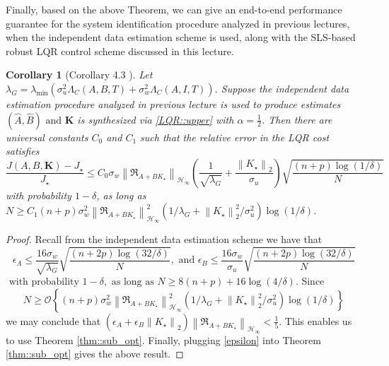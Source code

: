 \documentclass{article}[12pt]
\newtheorem{corollary}{Corollary}
\begin{document}
Finally, based on the above Theorem, we can give an end-to-end performance guarantee for the system identification procedure analyzed in previous lectures, when the independent data estimation scheme is used, along with the SLS-based robust LQR control scheme discussed in this lecture.

\begin{corollary}[Corollary 4.3 \cite{dean2017sample}]
\label{coro::sample}
Let $\lambda_{G}=\lambda_{\min }\left(\sigma_{u}^{2} \Lambda_{C}(A, B, T)+\sigma_{w}^{2} \Lambda_{C}(A, I, T)\right)$. Suppose the independent data estimation procedure analyzed in previous lecture is used to produce estimates $(\widehat{A}, \widehat{B}) \text { and } \mathbf{K}$ is synthesized via \eqref{LQR::upper} with $\alpha = \frac{1}{2}$. Then there are universal constants $C_0$ and $C_1$ such that the relative error in the LQR cost satisfies
\begin{equation}
    \frac{J(A, B, \mathbf{K})-J_{\star}}{J_{\star}} \leq C_{0} \sigma_{w}\left\|\mathfrak{R}_{A+B K_{\star}}\right\|_{\mathcal{H}_{\infty}}\left(\frac{1}{\sqrt{\lambda_{G}}}+\frac{\left\|K_{\star}\right\|_{2}}{\sigma_{u}}\right) \sqrt{\frac{(n+p) \log (1 / \delta)}{N}}
\end{equation}
with probability $1-\delta$, as long as $N \geq C_{1}(n+p) \sigma_{w}^{2}\left\|\mathfrak{R}_{A+B K_{\star}}\right\|_{\mathcal{H}_{\infty}}^{2}\left(1 / \lambda_{G}+\left\|K_{\star}\right\|_{2}^{2} / \sigma_{u}^{2}\right) \log (1 / \delta)$.
\end{corollary}
\begin{proof}
Recall from the independent data estimation scheme we have that
\begin{equation}
\label{epsilon}
    \epsilon_{A} \leq \frac{16 \sigma_{w}}{\sqrt{\lambda_{G}}} \sqrt{\frac{(n+2 p) \log (32 / \delta)}{N}}, \text { and } \epsilon_{B} \leq \frac{16 \sigma_{w}}{\sigma_{u}} \sqrt{\frac{(n+2 p) \log (32 / \delta)}{N}}
\end{equation}
$\text { with probability } 1-\delta, \text { as long as } N \geq 8(n+p)+16 \log (4 / \delta)$. 
Since 
\begin{equation}
    N \geq \mathcal{O}\left\{(n+p) \sigma_{w}^{2}\left\|\mathfrak{R}_{A+B K_{\star}}\right\|_{\mathcal{H}_{\infty}}^{2}\left(1 / \lambda_{G}+\left\|K_{\star}\right\|_{2}^{2} / \sigma_{u}^{2}\right) \log (1 / \delta)\right\}
\end{equation}
we may conclude that $\left(\epsilon_{A}+\epsilon_{B}\left\|K_{\star}\right\|_{2}\right)\left\|\mathfrak{R}_{A+B K_{\star}}\right\|_{\mathcal{H}_{\infty}}<\frac{1}{5}$.
This enables us to use Theorem \ref{thm::sub_opt}.
Finally, plugging \eqref{epsilon} into Theorem \ref{thm::sub_opt} gives the above result.
\end{proof}
\end{document}
